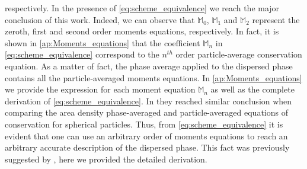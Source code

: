 respectively. 
In the presence of \ref{eq:scheme_equivalence} we reach the major conclusion of this work. 
Indeed, we can observe that $\mathbb{M}_0$, $\mathbb{M}_1$ and $\mathbb{M}_2$ represent the zeroth, first and second order moments equations, respectively. 
In fact, it is shown in \ref{ap:Moments_equations} that the coefficient $\mathbb{M}_n$ in \ref{eq:scheme_equivalence} correspond to the $n^{th}$ order particle-average conservation equation. 
As a matter of fact, the phase average applied to the dispersed phase contains all the particle-averaged moments equations.
In \ref{ap:Moments_equations} we provide the expression for each moment equation $\mathbb{M}_n$ as well as the complete derivation of \ref{eq:scheme_equivalence}. 
In \cite{lhuillier2000bilan} they reached similar conclusion when comparing the area density phase-averaged and particle-averaged equations of conservation for spherical particles. 
Thus, from \ref{eq:scheme_equivalence} it is evident that one can use an arbitrary order of moments equations to reach an arbitrary accurate description of the dispersed phase.
This fact was previously suggested by \citet{zhang1997momentum}, here we provided the detailed derivation.  

